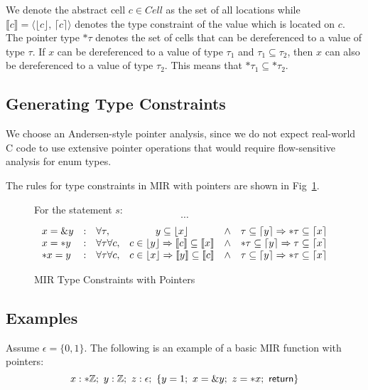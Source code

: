 \documentclass[peerreview, 10pt]{IEEEtran}
\newcommand{\Z}{\ensuremath{\mathbb{Z}}}
\newcommand{\cons}[1]{\ensuremath{\llbracket#1\rrbracket}}
\newcommand{\consp}[2]{\ensuremath{\langle#1,\,#2\rangle}}
\newcommand{\floor}[1]{\ensuremath{\lfloor#1\rfloor}}
\newcommand{\ceil}[1]{\ensuremath{\lceil#1\rceil}}
\newcommand{\enum}{\ensuremath{\epsilon}}
\newcommand{\ifrule}[2]{\ensuremath{#1&:&#2}}
\begin{document}
We denote the abstract cell $c\in\mathit{Cell}$ as the set of all locations while $\cons{c}=\consp{\floor{c}}{\ceil{c}}$ denotes the type constraint of the value which is located on $c$. The pointer type $*\tau$ denotes the set of cells that can be dereferenced to a value of type $\tau$. If $x$ can be dereferenced to a value of type $\tau_1$ and $\tau_1\subseteq\tau_2$, then $x$ can also be dereferenced to a value of type $\tau_2$. This means that $*\tau_1\subseteq *\tau_2$.

\subsection{Generating Type Constraints}

We choose an Andersen-style pointer analysis, since we do not expect real-world C code to use extensive pointer operations that would require flow-sensitive analysis for enum types.

The rules for type constraints in MIR with pointers are shown in Fig~\ref{fig:mir-pointers-type-constraints}.

\begin{figure}[ht]
\begin{framed}
For the statement $s$:
\[\cdots\]
\[
\begin{array}{@{}lclccc@{}}
  \ifrule{x=\&y}{\forall\tau,&y\subseteq \floor{x}&\land&\tau\subseteq\ceil{y}\Rightarrow*\tau\subseteq\ceil{x}}\\
  \ifrule{x=*y}{\forall\tau\forall c,&
    c\in \floor{y}\Rightarrow\cons{c}\subseteq\cons{x}&\land&
    *\tau\subseteq\ceil{y}\Rightarrow\tau\subseteq\ceil{x}
  }\\
  \ifrule{*x=y}{\forall\tau\forall c,&
    c\in \floor{x}\Rightarrow\cons{y}\subseteq\cons{c}&\land&
    \tau\subseteq\ceil{y}\Rightarrow*\tau\subseteq\ceil{x}
  }
\end{array}
\]
\end{framed}
\caption{MIR Type Constraints with Pointers}
\label{fig:mir-pointers-type-constraints}
\end{figure}

\subsection{Examples}

Assume $\enum = \{0,1\}$.
The following is an example of a basic MIR function with pointers:
\[
  x:*\Z;\ y:\Z;\ z:\enum;\ \{y=1;\ x=\&y;\ z=*x;\ \sf return\}
\]
\end{document}
